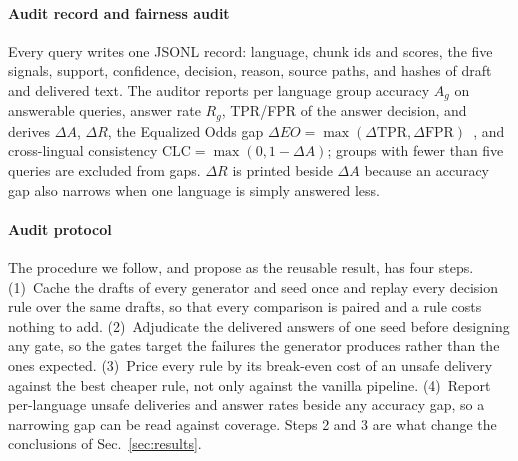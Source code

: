 \paragraph{Audit record and fairness audit} Every query writes one JSONL record: language, chunk ids and scores, the five signals, support, confidence, decision, reason, source paths, and hashes of draft and delivered text. The auditor reports per language group accuracy $A_g$ on answerable queries, answer rate $R_g$, TPR/FPR of the answer decision, and derives $\Delta A$, $\Delta R$, the Equalized Odds gap $\Delta EO=\max(\Delta\mathrm{TPR},\Delta\mathrm{FPR})$~\cite{hardt2016equality}, and cross-lingual consistency $\mathrm{CLC}=\max(0,1-\Delta A)$; groups with fewer than five queries are excluded from gaps. $\Delta R$ is printed beside $\Delta A$ because an accuracy gap also narrows when one language is simply answered less.

\paragraph{Audit protocol} The procedure we follow, and propose as the reusable result, has four steps. (1)~Cache the drafts of every generator and seed once and replay every decision rule over the same drafts, so that every comparison is paired and a rule costs nothing to add. (2)~Adjudicate the delivered answers of one seed before designing any gate, so the gates target the failures the generator produces rather than the ones expected. (3)~Price every rule by its break-even cost of an unsafe delivery against the best cheaper rule, not only against the vanilla pipeline. (4)~Report per-language unsafe deliveries and answer rates beside any accuracy gap, so a narrowing gap can be read against coverage. Steps 2 and 3 are what change the conclusions of Sec.~\ref{sec:results}.

